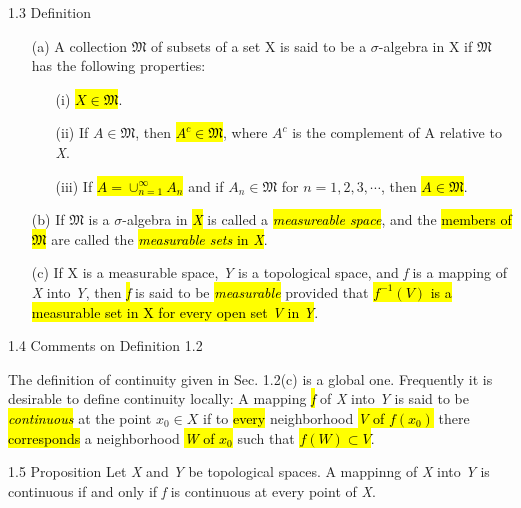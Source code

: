 \documentclass{article}
\begin{document}
\begin{defi}{1.3 Definition}
	\begin{enumerate}
  \item [(a)] A collection $\mathfrak{M}$ of subsets of a set X is said to be a $\sigma$-algebra in X if $\mathfrak{M}$ has the following properties:
  \begin{enumerate}
  \item [(i)] \hl{$X\in\mathfrak{M}$}.
  \item [(ii)] If $A\in\mathfrak{M}$, then \hl{$A^c\in\mathfrak{M}$}, where $A^c$ is the complement of A relative to \textit{X}.
  \item [(iii)] If \hl{$A=\cup^\infty_{n=1}A_n$} and if $A_n\in\mathfrak{M}$ for $n=1,2,3,\cdots$, then \hl{$A\in\mathfrak{M}$}.
\end{enumerate}
  \item [(b)] If $\mathfrak{M}$ is a $\sigma$-algebra in \hl{\textit{X}} is called a \hl{\textit{measureable space}}, and the \hl{members of $\mathfrak{M}$} are called the \hl{\textit{measurable sets} in \textit{X}}.
  \item [(c)] If X is a measurable space, \textit{Y} is a topological space, and \textit{f} is a mapping of \textit{X} into \textit{Y}, then \hl{\textit{f}} is said to be \hl{\textit{measurable}} provided that \hl{$f^{-1}(V)$ is a measurable set in X for every open set \textit{V} in \textit{Y}}.
\end{enumerate}

\end{defi}

\begin{com}{1.4 Comments on Definition 1.2}

The definition of continuity given in Sec. 1.2(c) is a global one. Frequently it is desirable to define continuity locally: A mapping \hl{\textit{f}} of \textit{X} into \textit{Y} is said to be \hl{\textit{continuous}} at the point $x_0\in X$ if to \hl{every} neighborhood \hl{\textit{V} of $f(x_0)$} there \hl{corresponds} a neighborhood \hl{\textit{W} of $x_0$} such that \hl{$f(W)\subset V$}.
	
\end{com}

\begin{prop}{1.5 Proposition}
	Let \textit{X} and \textit{Y} be topological spaces. A mappinng of \textit{X} into \textit{Y} is continuous if and only if \textit{f} is continuous at every point of \textit{X}. 
\end{prop}
\end{document}
